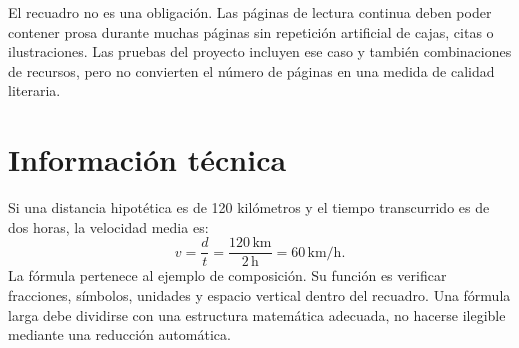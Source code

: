 El recuadro no es una obligación. Las páginas de lectura continua deben poder contener prosa durante muchas páginas sin repetición artificial de cajas, citas o ilustraciones. Las pruebas del proyecto incluyen ese caso y también combinaciones de recursos, pero no convierten el número de páginas en una medida de calidad literaria.

\section{Información técnica}
\begin{technicalbox}
Si una distancia hipotética es de 120 kilómetros y el tiempo transcurrido es de dos horas, la velocidad media es:
\[
 v=\frac{d}{t}=\frac{120\,\mathrm{km}}{2\,\mathrm{h}}=60\,\mathrm{km/h}.
\]
La fórmula pertenece al ejemplo de composición. Su función es verificar fracciones, símbolos, unidades y espacio vertical dentro del recuadro. Una fórmula larga debe dividirse con una estructura matemática adecuada, no hacerse ilegible mediante una reducción automática.
\end{technicalbox}
